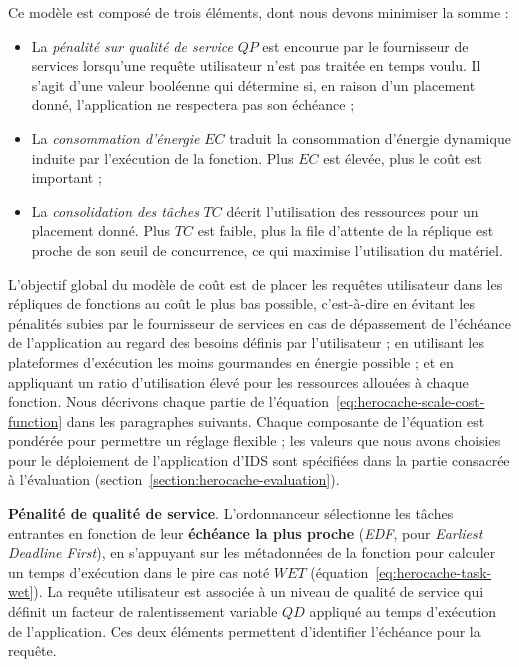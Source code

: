 Ce modèle est composé de trois éléments, dont nous devons minimiser la somme :

\begin{itemize}
    \item La \textit{pénalité sur qualité de service} $QP$ est encourue par le fournisseur de services lorsqu'une requête utilisateur n'est pas traitée en temps voulu. Il s'agit d'une valeur booléenne qui détermine si, en raison d'un placement donné, l'application ne respectera pas son échéance ;
    \item La \textit{consommation d'énergie} $EC$ traduit la consommation d'énergie dynamique induite par l'exécution de la fonction. Plus $EC$ est élevée, plus le coût est important ;
    \item La \textit{consolidation des tâches} $TC$ décrit l'utilisation des ressources pour un placement donné. Plus $TC$ est faible, plus la file d'attente de la réplique est proche de son seuil de concurrence, ce qui maximise l'utilisation du matériel.
\end{itemize}

L'objectif global du modèle de coût est de placer les requêtes utilisateur dans les répliques de fonctions au coût le plus bas possible, c'est-à-dire en évitant les pénalités subies par le fournisseur de services en cas de dépassement de l'échéance de l'application au regard des besoins définis par l'utilisateur ; en utilisant les plateformes d'exécution les moins gourmandes en énergie possible ; et en appliquant un ratio d'utilisation élevé pour les ressources allouées à chaque fonction. Nous décrivons chaque partie de l'équation~\ref{eq:herocache-scale-cost-function} dans les paragraphes suivants. Chaque composante de l'équation est pondérée pour permettre un réglage flexible ; les valeurs que nous avons choisies pour le déploiement de l'application d'IDS sont spécifiées dans la partie consacrée à l'évaluation (section~\ref{section:herocache-evaluation}).

\textbf{Pénalité de qualité de service}. L'ordonnanceur sélectionne les tâches entrantes en fonction de leur \textbf{échéance la plus proche} (\textit{EDF}, pour \textit{Earliest Deadline First}), en s'appuyant sur les métadonnées de la fonction pour calculer un temps d'exécution dans le pire cas noté $WET$ (équation~\ref{eq:herocache-task-wet}). La requête utilisateur est associée à un niveau de qualité de service qui définit un facteur de ralentissement variable $QD$ appliqué au temps d'exécution de l'application. Ces deux éléments permettent d'identifier l'échéance pour la requête.

